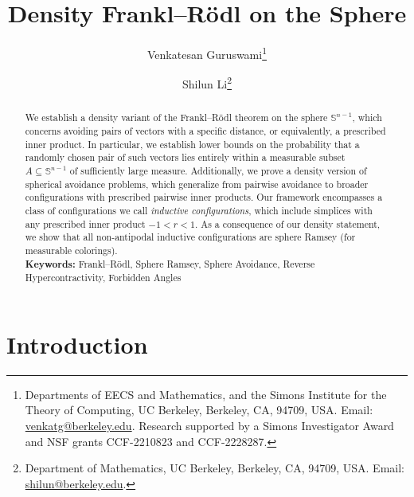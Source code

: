 \documentclass[11pt]{article}
\date{}
\begin{document}
\title{\textbf{Density Frankl–Rödl on the Sphere}}
\author{
Venkatesan Guruswami\thanks{{Departments of EECS and Mathematics, and the Simons Institute for the Theory of Computing, UC Berkeley, Berkeley, CA, 94709, USA. Email: \url{venkatg@berkeley.edu}. Research supported by a Simons Investigator Award and NSF grants CCF-2210823 and CCF-2228287.}}
\and 
Shilun Li\thanks{Department of Mathematics, UC Berkeley, Berkeley, CA, 94709, USA. Email: \url{shilun@berkeley.edu}.} 
}
\maketitle
\begin{abstract}
We establish a density variant of the Frankl–Rödl theorem on the sphere $\mathbb{S}^{n-1}$, which concerns avoiding pairs of vectors with a specific distance, or equivalently, a prescribed inner product. In particular, we establish lower bounds on the probability that a randomly chosen pair of such vectors lies entirely within a measurable subset $A \subseteq \mathbb{S}^{n-1}$ of sufficiently large measure. Additionally, we prove a density version of spherical avoidance problems, which generalize from pairwise avoidance to broader configurations with prescribed pairwise inner products. Our framework encompasses a class of configurations we call \textit{inductive configurations}, which include simplices with any prescribed inner product $-1 < r < 1$. As a consequence of our density statement, we show that all non-antipodal inductive configurations are sphere Ramsey (for measurable colorings).
\vspace{0.2in}\\
\textbf{Keywords:} Frankl–Rödl, Sphere Ramsey, Sphere Avoidance, Reverse Hypercontractivity, Forbidden Angles
\end{abstract}

\section{Introduction}
\end{document}
